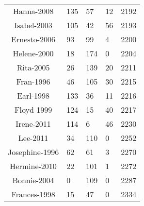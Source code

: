 \begin{table}[ht]
\begin{tabular}{cp{3cm}p{3cm}p{3cm}p{3cm}}
  Hanna-2008 & 135 &  57 &  12 & 2192 \\ 
  Isabel-2003 & 105 &  42 &  56 & 2193 \\ 
  Ernesto-2006 &  93 &  99 &   4 & 2200 \\ 
  Helene-2000 &  18 & 174 &   0 & 2204 \\ 
  Rita-2005 &  26 & 139 &  20 & 2211 \\ 
  Fran-1996 &  46 & 105 &  30 & 2215 \\ 
  Earl-1998 & 133 &  36 &  11 & 2216 \\ 
  Floyd-1999 & 124 &  15 &  40 & 2217 \\ 
  Irene-2011 & 114 &   6 &  46 & 2230 \\ 
  Lee-2011 &  34 & 110 &   0 & 2252 \\ 
  Josephine-1996 &  62 &  61 &   3 & 2270 \\ 
  Hermine-2010 &  22 & 101 &   1 & 2272 \\ 
  Bonnie-2004 &   0 & 109 &   0 & 2287 \\ 
  Frances-1998 &  15 &  47 &   0 & 2334 \\ 
   \bottomrule
\end{tabular}
\end{table}
